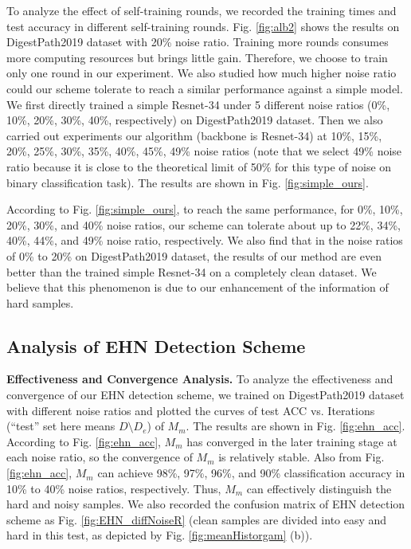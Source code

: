 {To analyze the effect of self-training rounds, we recorded the training times and test accuracy in different self-training rounds. Fig. \ref{fig:alb2} shows the results on DigestPath2019 dataset with 20\% noise ratio. Training more rounds consumes more computing resources but brings little gain. Therefore, we choose to train only one round in our experiment. We also studied how much higher noise ratio could our scheme tolerate to reach a similar performance against a simple model. We first directly trained a simple Resnet-34 under 5 different noise ratios (0\%, 10\%, 20\%, 30\%, 40\%, respectively) on DigestPath2019 dataset. Then we also carried out experiments }{our algorithm (backbone is Resnet-34) at 10\%, 15\%, 20\%, 25\%, 30\%, 35\%, 40\%, 45\%, 49\% noise ratios (note that we select 49\% noise ratio because it is close to the theoretical limit of 50\% for this type of noise on binary classification task). The results are shown in Fig. \ref{fig:simple_ours}.}

{According to Fig. \ref{fig:simple_ours}, to reach the same performance, for 0\%, 10\%, 20\%, 30\%, and 40\% noise ratios, our scheme can tolerate about up to 22\%, 34\%, 40\%, 44\%, and 49\% noise ratio, respectively. We also find that in the noise ratios of 0\% to 20\% on DigestPath2019 dataset, the results of our method are even better than the trained simple Resnet-34 on a completely clean dataset. We believe that this phenomenon is due to our enhancement of the information of hard samples.}


\subsection{Analysis of EHN Detection Scheme}

{\textbf{Effectiveness and Convergence Analysis.} To analyze the effectiveness and convergence of our EHN detection scheme, we trained on DigestPath2019 dataset with different noise ratios and plotted the curves of test ACC vs. Iterations (``test'' set here means $D \setminus D_e$) of $M_m$. The results are shown in Fig. \ref{fig:ehn_acc}. According to Fig. \ref{fig:ehn_acc}, $M_m$ has converged in the later training stage at each noise ratio, so the convergence of $M_m$ is relatively stable. Also from Fig. \ref{fig:ehn_acc}, $M_m$ can achieve 98\%, 97\%, 96\%, and 90\% classification accuracy in 10\% to 40\% noise ratios, respectively. Thus, $M_m$ can effectively distinguish the hard and noisy samples. We also recorded the confusion matrix of EHN detection scheme as Fig. \ref{fig:EHN_diffNoiseR} {(clean samples} {are divided into easy and hard in this test, as depicted by Fig. \ref{fig:meanHistorgam} (b)).}}

